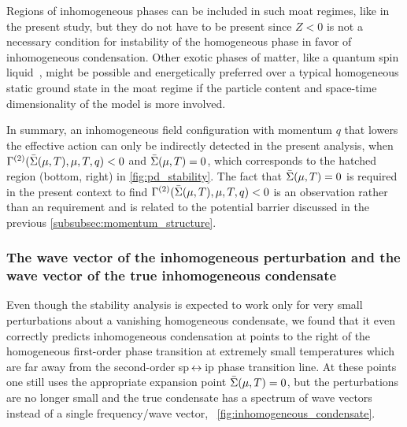 Regions of inhomogeneous phases can be included in such moat regimes, like in the present study, but they do not have to be present since $Z<0$ is not a necessary condition for instability of the homogeneous phase in favor of inhomogeneous condensation.
Other exotic phases of matter, like a quantum spin liquid~\cite{Pisarski:2020dnx}, might be possible and energetically preferred over a typical homogeneous static ground state in the moat regime \dash{} if the particle content and space-time dimensionality of the model is more involved.

In summary, an inhomogeneous field configuration with momentum $q$ that lowers the effective action can only be indirectly detected in the present analysis, when $\Gamma^{(2)} ( \bar{\Sigma} ( \mu, T ), \mu, T, q) < 0$ and ${\bar{\Sigma} ( \mu, T ) = 0}$, which corresponds to the hatched region (bottom, right) in \cref{fig:pd_stability}.
The fact that ${\bar{\Sigma} ( \mu, T ) = 0}$ is required in the present context to find $\Gamma^{(2)} ( \bar{\Sigma} ( \mu, T ), \mu, T, q) < 0$ is an \aposteriori{} observation rather than an \apriori{} requirement and is related to the potential barrier discussed in the previous \cref{subsubsec:momentum_structure}.

\subsubsection{The wave vector of the inhomogeneous perturbation and the wave vector of the true inhomogeneous condensate}
\label{subsubsec:wavevector}
Even though the stability analysis is expected to work only for very small perturbations about a vanishing homogeneous condensate, we found that it even correctly predicts inhomogeneous condensation at points to the right of the homogeneous first-order phase transition at extremely small temperatures which are far away from the second-order \gls{sp}$\,\leftrightarrow\,$\gls{ip} phase transition line.
At these points one still uses the appropriate expansion point ${\bar{\Sigma} ( \mu, T ) = 0}$, but the perturbations are no longer small and the true condensate has a spectrum of wave vectors instead of a single frequency/wave vector, \cf{}\ \cref{fig:inhomogeneous_condensate}.
	
